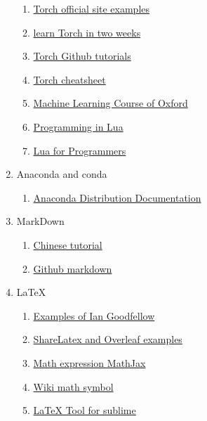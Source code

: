 \documentclass[12pt, a4paper]{article}
\begin{document}
\begin{enumerate}
\begin{enumerate}
      \item \href{http://torch.ch/}{Torch official site examples}
      \item \href{https://www.quora.com/What-are-the-best-resources-to-use-to-learn-Torch-in-two-weeks}{ learn Torch in two weeks}
      \item \href{https://github.com/torch/tutorials}{Torch Github tutorials}
      \item \href{https://github.com/torch/torch7/wiki/Cheatsheet}{Torch cheatsheet}
      \item \href{https://www.cs.ox.ac.uk/people/nando.defreitas/machinelearning/}{Machine Learning Course of Oxford}
      \item \href{http://www.lua.org/pil/contents.html}{Programming in Lua}
      \item \href{http://nova-fusion.com/2012/08/27/lua-for-programmers-part-1/}{Lua for Programmers}
    \end{enumerate}
  \item Anaconda and conda
    \begin{enumerate}
      \item \href{https://docs.anaconda.com/anaconda/}{Anaconda Distribution Documentation} 
    \end{enumerate}
  \item MarkDown
    \begin{enumerate}
      \item \href{https://www.appinn.com/markdown/}{Chinese tutorial}
      \item \href{https://guides.github.com/features/mastering-markdown/}{Github markdown}
    \end{enumerate}
  \item \LaTeX{}
    \begin{enumerate}
      \item \href{https://github.com/goodfeli/dlbook_notation}{Examples of Ian Goodfellow}
      \item \href{https://www.sharelatex.com/learn}{ShareLatex and Overleaf examples}
      \item \href{https://math.meta.stackexchange.com/questions/5020/mathjax-basic-tutorial-and-quick-reference}{Math expression MathJax}
      \item \href{https://zh.wikibooks.org/w/index.php?title=LaTeX%2F%E6%95%B0%E5%AD%A6%E5%85%AC%E5%BC%8F&variant=zh-cn}{Wiki math symbol}
      \item \href{https://latextools.readthedocs.io/en/latest/}{LaTeX Tool for sublime}
    \end{enumerate}

\end{enumerate}
\end{document}
